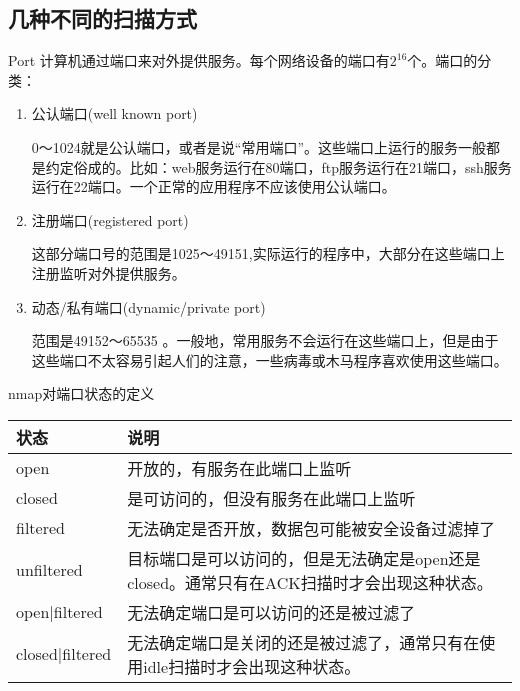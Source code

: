 \documentclass{beamer}
\begin{document}
\subsection{几种不同的扫描方式}
\begin{frame}
\end{frame}
\begin{frame}{Port}
计算机通过端口来对外提供服务。每个网络设备的端口有$2^{16}$个。端口的分类：
\begin{enumerate}
\item
公认端口(well known port)

0〜1024就是公认端口，或者是说“常用端口”。这些端口上运行的服务一般都是约定俗成的。比如：web服务运行在80端口，ftp服务运行在21端口，ssh服务运行在22端口。一个正常的应用程序不应该使用公认端口。
\item
注册端口(registered port)

这部分端口号的范围是1025〜49151,实际运行的程序中，大部分在这些端口上注册监听对外提供服务。
\item
动态/私有端口(dynamic/private port)

范围是49152〜65535 。一般地，常用服务不会运行在这些端口上，但是由于这些端口不太容易引起人们的注意，一些病毒或木马程序喜欢使用这些端口。
\end{enumerate}
\end{frame}
\begin{frame}{nmap对端口状态的定义}
\begin{table}
\begin{tabular}{ll}
\toprule
\textbf{状态}&\textbf{说明}\\
\midrule
open&开放的，有服务在此端口上监听\\
closed&是可访问的，但没有服务在此端口上监听\\
filtered&无法确定是否开放，数据包可能被安全设备过滤掉了\\
unfiltered&目标端口是可以访问的，但是无法确定是open还是closed。通常只有在ACK扫描时才会出现这种状态。\\
open|filtered&无法确定端口是可以访问的还是被过滤了\\
closed|filtered&无法确定端口是关闭的还是被过滤了，通常只有在使用idle扫描时才会出现这种状态。\\

\bottomrule
\end{tabular}
\end{table}
\end{frame}
\end{document}
